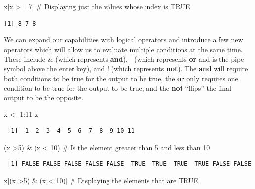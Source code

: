 \documentclass[
  letterpaper,
  DIV=11,
  numbers=noendperiod]{scrreprt}
\newenvironment{Shaded}{\begin{snugshade}}{\end{snugshade}}
\newcommand{\CommentTok}[1]{\textcolor[rgb]{0.37,0.37,0.37}{#1}}
\newcommand{\DecValTok}[1]{\textcolor[rgb]{0.68,0.00,0.00}{#1}}
\newcommand{\NormalTok}[1]{\textcolor[rgb]{0.00,0.23,0.31}{#1}}
\newcommand{\OtherTok}[1]{\textcolor[rgb]{0.00,0.23,0.31}{#1}}
\newcommand{\SpecialCharTok}[1]{\textcolor[rgb]{0.37,0.37,0.37}{#1}}
\begin{document}
\begin{Shaded}
\begin{Highlighting}[]
\NormalTok{x[x }\SpecialCharTok{\textgreater{}=} \DecValTok{7}\NormalTok{] }\CommentTok{\# Displaying just the values whose index is TRUE}
\end{Highlighting}
\end{Shaded}

\begin{verbatim}
[1] 8 7 8
\end{verbatim}

We can expand our capabilities with logical operators and introduce a
few new operators which will allow us to evaluate multiple conditions at
the same time. These include \& (which represents \textbf{and}),
\(\vert\) (which represents \textbf{or} and is the pipe symbol above the
enter key), and ! (which represents \textbf{not}). The \textbf{and} will
require both conditions to be true for the output to be true, the
\textbf{or} only requires one condition to be true for the output to be
true, and the \textbf{not} ``flips'' the final output to be the
opposite.

\begin{Shaded}
\begin{Highlighting}[]
\NormalTok{x }\OtherTok{\textless{}{-}} \DecValTok{1}\SpecialCharTok{:}\DecValTok{11}
\NormalTok{x}
\end{Highlighting}
\end{Shaded}

\begin{verbatim}
 [1]  1  2  3  4  5  6  7  8  9 10 11
\end{verbatim}

\begin{Shaded}
\begin{Highlighting}[]
\NormalTok{(x }\SpecialCharTok{\textgreater{}}\DecValTok{5}\NormalTok{) }\SpecialCharTok{\&}\NormalTok{ (x }\SpecialCharTok{\textless{}} \DecValTok{10}\NormalTok{) }\CommentTok{\# Is the element greater than 5 and less than 10}
\end{Highlighting}
\end{Shaded}

\begin{verbatim}
 [1] FALSE FALSE FALSE FALSE FALSE  TRUE  TRUE  TRUE  TRUE FALSE FALSE
\end{verbatim}

\begin{Shaded}
\begin{Highlighting}[]
\NormalTok{x[(x }\SpecialCharTok{\textgreater{}}\DecValTok{5}\NormalTok{) }\SpecialCharTok{\&}\NormalTok{ (x }\SpecialCharTok{\textless{}} \DecValTok{10}\NormalTok{)] }\CommentTok{\# Displaying the elements that are TRUE}
\end{Highlighting}
\end{Shaded}
\end{document}

